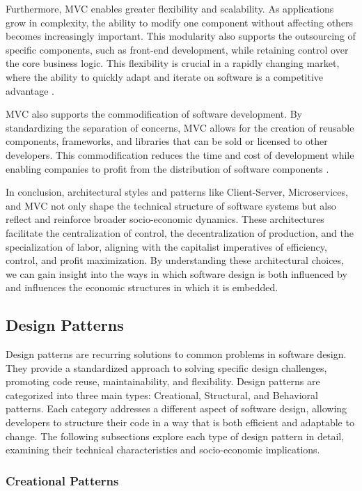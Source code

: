 \begin{refsection}
Furthermore, MVC enables greater flexibility and scalability. As applications grow in complexity, the ability to modify one component without affecting others becomes increasingly important. This modularity also supports the outsourcing of specific components, such as front-end development, while retaining control over the core business logic. This flexibility is crucial in a rapidly changing market, where the ability to quickly adapt and iterate on software is a competitive advantage \cite[pp.~88-90]{Gamma2015}.

MVC also supports the commodification of software development. By standardizing the separation of concerns, MVC allows for the creation of reusable components, frameworks, and libraries that can be sold or licensed to other developers. This commodification reduces the time and cost of development while enabling companies to profit from the distribution of software components \cite[pp.~135-137]{Buschmann2007}.

In conclusion, architectural styles and patterns like Client-Server, Microservices, and MVC not only shape the technical structure of software systems but also reflect and reinforce broader socio-economic dynamics. These architectures facilitate the centralization of control, the decentralization of production, and the specialization of labor, aligning with the capitalist imperatives of efficiency, control, and profit maximization. By understanding these architectural choices, we can gain insight into the ways in which software design is both influenced by and influences the economic structures in which it is embedded.

\subsection{Design Patterns}

Design patterns are recurring solutions to common problems in software design. They provide a standardized approach to solving specific design challenges, promoting code reuse, maintainability, and flexibility. Design patterns are categorized into three main types: Creational, Structural, and Behavioral patterns. Each category addresses a different aspect of software design, allowing developers to structure their code in a way that is both efficient and adaptable to change. The following subsections explore each type of design pattern in detail, examining their technical characteristics and socio-economic implications.

\subsubsection{Creational Patterns}


\end{refsection}
